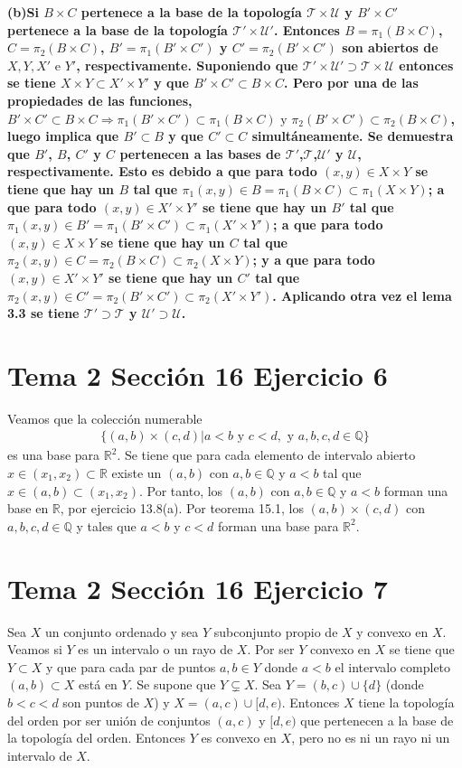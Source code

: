 \documentclass{article}
\begin{document}
\bf(b)\rm Si $B\times C$ pertenece a la base de la topología $\mathcal{T}\times \mathcal{U}$ y $B'\times C'$ pertenece a la base de la topología $\mathcal{T}'\times \mathcal{U}'$. Entonces $B=\pi_1(B\times C)$,  $C=\pi_2(B\times C)$, $B'=\pi_1(B'\times C')$ y $C'=\pi_2(B'\times C')$ son abiertos de $X,Y,X'\text { e }Y'$, respectivamente. Suponiendo que $\mathcal{T}'\times \mathcal{U}'\supset\mathcal{T}\times \mathcal{U}$ entonces se tiene $X\times Y\subset X'\times Y'$ y que $B'\times C'\subset B\times C$. Pero por una de las propiedades de las funciones, $B'\times C'\subset B\times C\Rightarrow \pi_1(B'\times C')\subset \pi_1(B\times C)\text{ y } \pi_2(B'\times C')\subset \pi_2(B\times C)$, luego implica que $B'\subset B$ y que $C'\subset C$ simultáneamente. Se demuestra que $B'$, $B$, $C'$ y $C$ pertenecen a las bases de $\mathcal{T}'$,$\mathcal{T}$,$\mathcal{U}'$ y $\mathcal{U}$, respectivamente. Esto es debido a que para todo $(x,y)\in X\times Y$ se tiene que hay un $B$ tal que $\pi_1(x,y)\in B=\pi_1(B\times C)\subset  \pi_1(X\times Y)$; a que para todo $(x,y)\in X'\times Y'$ se tiene que hay un $B'$ tal que $\pi_1(x,y)\in B'=\pi_1(B'\times C')\subset  \pi_1(X'\times Y')$; a que para todo $(x,y)\in X\times Y$ se tiene que hay un $C$ tal que $\pi_2(x,y)\in C=\pi_2(B\times C)\subset  \pi_2(X\times Y)$; y a que para todo $(x,y)\in X'\times Y'$ se tiene que hay un $C'$ tal que $\pi_2(x,y)\in C'=\pi_2(B'\times C')\subset  \pi_2(X'\times Y')$.  Aplicando otra vez el lema 3.3 se tiene $\mathcal{T}'\supset\mathcal{T}$ y $\mathcal{U}'\supset\mathcal{U}$.
\section{Tema 2 Sección 16 Ejercicio 6}
Veamos que la colección numerable
\begin{equation}
\begin{aligned}
\{(a,b)\times (c,d)|a<b\text{ y }c<d, \text{ y }a,b,c,d\in \mathbb{Q}\}
\end{aligned}
\end{equation}
es una base para $\mathbb{R}^2$. Se tiene que para cada elemento de intervalo abierto $x\in(x_1,x_2)\subset \mathbb{R}$  existe un $(a,b)$ con $a,b\in \mathbb{Q}$ y $a<b$ tal que $x\in(a,b)\subset(x_1,x_2)$. Por tanto, los $(a,b)$ con $a,b\in \mathbb{Q}$ y $a<b$ forman una base en $\mathbb{R}$, por ejercicio 13.8(a). Por teorema 15.1, los $(a,b)\times (c,d)$ con $a,b,c,d\in \mathbb{Q}$ y tales que $a<b$ y $c<d$ forman una base para $\mathbb{R}^2$.
\section{Tema 2 Sección 16 Ejercicio 7}
Sea $X$ un conjunto ordenado y sea $Y$ subconjunto propio de $X$ y convexo en $X$. Veamos si $Y$ es un intervalo o un rayo de $X$.
Por ser $Y$ convexo en $X$ se tiene que $Y\subset X$ y que para cada par de puntos $a,b\in Y$ donde $ a<b$ el intervalo completo $(a,b)\subset X$ está en $Y$. Se supone que $Y\subsetneq X$. Sea $Y=(b,c)\cup\{d\}$ (donde $b<c<d$ son puntos de $X$) y $X=(a,c)\cup[d,e)$. Entonces $X$ tiene la topología del orden por ser unión de conjuntos $(a,c)$ y $[d,e)$ que pertenecen a la base de la topología del orden. Entonces $Y$ es convexo en $X$, pero no es ni un rayo ni un intervalo de $X$.
\end{document}
